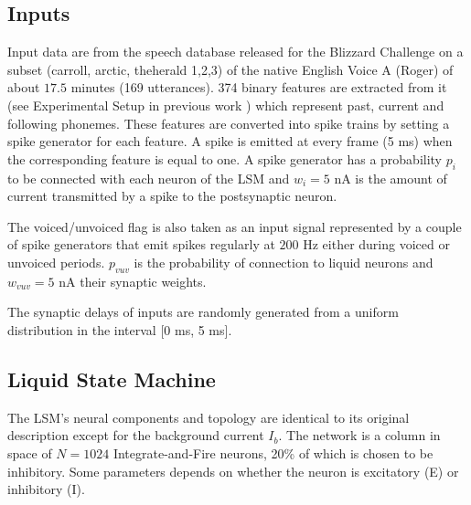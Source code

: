 \documentclass[11pt, a4paper]{article} %
\begin{document}
\subsection{Inputs}
Input data are from the speech database released for the Blizzard Challenge \cite{karaiskos2008blizzard} on a subset (carroll, arctic, theherald 1,2,3) of the native English Voice A (Roger) of about $17.5$ minutes (169 utterances). 374 binary features are extracted from it (see Experimental Setup in previous work \cite{schnell2018neural}) which represent past, current and following phonemes. These features are converted into spike trains by setting a spike generator for each feature. A spike is emitted at every frame (5 ms) when the corresponding feature is equal to one.
A spike generator has a probability $p_i$ to be connected with each neuron of the LSM and $w_i = 5$ nA is the amount of current transmitted by a spike to the postsynaptic neuron. 

The voiced/unvoiced flag is also taken as an input signal represented by a couple of spike generators that emit spikes regularly at $200$ Hz either during voiced or unvoiced periods. $p_{vuv}$ is the probability of connection to liquid neurons and $w_{vuv} = 5$ nA their synaptic weights.

The synaptic delays of inputs are randomly generated from a uniform distribution in the interval [0 ms, 5 ms].

\subsection{Liquid State Machine}

The LSM's neural components and topology are identical to its original description \cite{maass2002real} except for the background current $I_b$. The network is a column in space of $N = 1024$ Integrate-and-Fire neurons, 20\% of which is chosen to be inhibitory. Some parameters depends on whether the neuron is excitatory (E) or inhibitory (I).
\end{document}
